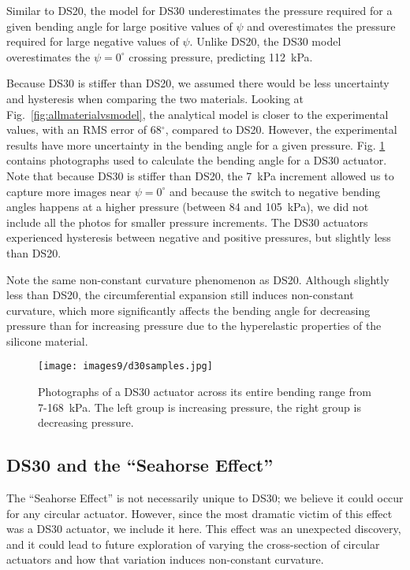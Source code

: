 Similar to DS20, the model for DS30 underestimates the pressure required for a given bending angle for large positive values of $\psi$ and overestimates the pressure required for large negative values of $\psi$. Unlike DS20, the DS30 model overestimates the $\psi=0^\circ$ crossing pressure, predicting 112~kPa. 

Because DS30 is stiffer than DS20, we assumed there would be less uncertainty and hysteresis when comparing the two materials. Looking at Fig.~\ref{fig:allmaterialvsmodel}, the analytical model is closer to the experimental values, with an RMS error of 68$^\circ$, compared to DS20. However, the experimental results have more uncertainty in the bending angle for a given pressure. Fig. \ref{fig:d30samples} contains photographs used to calculate the bending angle for a DS30 actuator. Note that because DS30 is stiffer than DS20, the 7~kPa increment allowed us to capture more images near $\psi=0^\circ$ and because the switch to negative bending angles happens at a higher pressure (between 84 and 105~kPa), we did not include all the photos for smaller pressure increments. The DS30 actuators experienced hysteresis between negative and positive pressures, but slightly less than DS20. 

Note the same non-constant curvature phenomenon as DS20. Although slightly less than DS20, the circumferential expansion still induces non-constant curvature, which more significantly affects the bending angle for decreasing pressure than for increasing pressure due to the hyperelastic properties of the silicone material. 

\begin{figure}[ht]
    \centering
     \texttt{[image: images9/d30samples.jpg]}
    \caption{Photographs of a DS30 actuator across its entire bending range from 7-168~kPa. The left group is increasing pressure, the right group is decreasing pressure.}
    \label{fig:d30samples}
\end{figure}

\clearpage
\subsection{DS30 and the ``Seahorse Effect''}

The ``Seahorse Effect'' is not necessarily unique to DS30; we believe it could occur for any circular actuator. However, since the most dramatic victim of this effect was a DS30 actuator, we include it here. This effect was an unexpected discovery, and it could lead to future exploration of varying the cross-section of circular actuators and how that variation induces non-constant curvature. 


